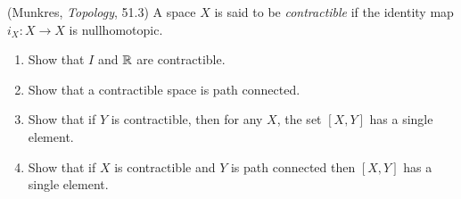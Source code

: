 \documentclass[12pt]{article}
\begin{document}
\begin{solu}

\end{solu}
\newpage

\begin{problab}{7}
(Munkres, \emph{Topology}, 51.3) A space $X$ is said to be \emph{contractible} if the identity map $i_X: X \to X$ is nullhomotopic. 
\begin{enumerate}
\item Show that $I$ and $\mathbb R$ are contractible.
\item Show that a contractible space is path connected.
\item Show that if $Y$ is contractible, then for any $X$, the set $[X,Y]$ has a single element.
\item Show that if $X$ is contractible and $Y$ is path connected then $[X,Y]$ has a single element. 
\end{enumerate}
\end{problab}
\end{document}
